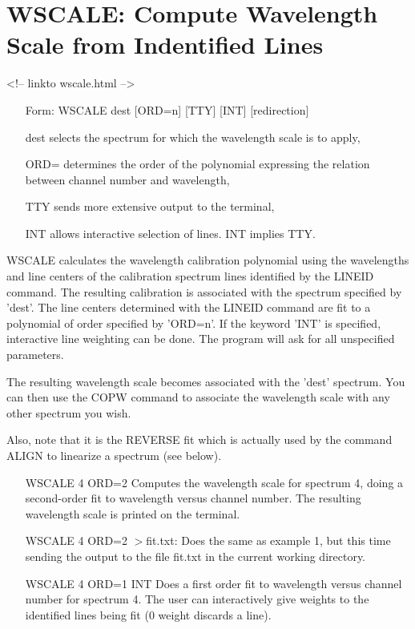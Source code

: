 \section{WSCALE: Compute Wavelength Scale from Indentified Lines}
\begin{rawhtml}
<!-- linkto wscale.html -->
\end{rawhtml}
\begin{itemize}
  \item[Form: WSCALE dest {[ORD=n]} {[TTY]} {[INT]} {[redirection]}\hfill]{}
  \item[dest]{selects the spectrum for which the wavelength scale is to apply,}
  \item[ORD=]{determines the order of the polynomial 
       expressing the relation between channel number and wavelength,}
  \item[TTY]{sends more extensive output to the terminal,}
  \item[INT]{allows interactive selection of lines.  INT implies TTY.}
\end{itemize}

WSCALE calculates the wavelength calibration polynomial using the
wavelengths and line centers of the calibration spectrum lines identified
by the LINEID command.  The resulting calibration is associated with the
spectrum specified by 'dest'. The line centers determined with the LINEID
command are fit to a polynomial of order specified by 'ORD=n'. If the
keyword 'INT' is specified, interactive line weighting can be done. The
program will ask for all unspecified parameters.

The resulting wavelength scale becomes associated with the 'dest'
spectrum. You can then use the COPW command to associate the wavelength
scale with any other spectrum you wish.

Also, note that it is the REVERSE fit which is actually used by the command
ALIGN to linearize a spectrum (see below).

\begin{itemize}
  \item[WSCALE 4 ORD=2\hfill]{ Computes the wavelength scale for spectrum
       4, doing a second-order fit to wavelength versus channel number. The
       resulting wavelength scale is printed on the terminal.}

  \item[WSCALE 4 ORD=2 $>$fit.txt:\hfill]{ Does the same as example 1, but
       this time sending the output to the file fit.txt in the
       current working directory.}

  \item[WSCALE 4 ORD=1 INT\hfill]{ Does a first order fit to wavelength
       versus channel number for spectrum 4.  The user can interactively
       give weights to the identified lines being fit (0 weight discards a
       line).}
\end{itemize}

